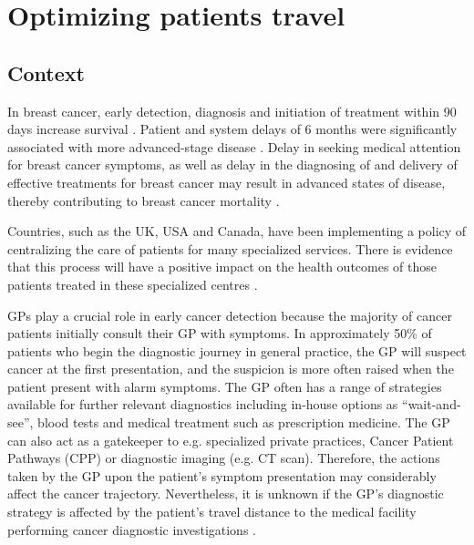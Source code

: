 \chapter{Optimizing patients travel}

\section{Context}

In breast cancer, early detection, diagnosis and initiation of treatment within 90 days increase survival \cite{williams_assessment_2015}.
Patient and system delays of 6 months were significantly associated with more advanced-stage disease \cite{pace_delays_2015}.
Delay in seeking medical attention for breast cancer symptoms, as well as delay in the diagnosing of and delivery of effective treatments for breast cancer may result in advanced states of disease, thereby contributing to breast cancer mortality \cite{caplan_delay_1992}.

Countries, such as the UK, USA and Canada, have been implementing a policy of centralizing the care of patients for many specialized services. There is evidence that this process will have a positive impact on the health outcomes of those patients treated in these specialized centres \cite{woo_centralisation_2012,morris_impact_2014,olejaz_denmark_2012,micheli_european_2003,kelly_are_2016,flytkjaer_virgilsen_cancer_2019}.

GPs play a crucial role in early cancer detection because the majority of cancer patients initially consult their GP with symptoms. In approximately 50\% of patients who begin the diagnostic journey in general practice, the GP will suspect cancer at the first presentation, and the suspicion is more often raised when the patient present with alarm symptoms. The GP often has a range of strategies available for further relevant diagnostics including in-house options as ``wait-and-see'', blood tests and medical treatment such as prescription medicine. The GP can also act as a gatekeeper to e.g. specialized private practices, Cancer Patient Pathways (CPP) or diagnostic imaging (e.g. CT scan). Therefore, the actions taken by the GP upon the patient's symptom presentation may considerably affect the cancer trajectory. Nevertheless, it is unknown if the GP's diagnostic strategy is affected by the patient's travel distance to the medical facility performing cancer diagnostic investigations \cite{flytkjaer_virgilsen_cancer_2019}.

